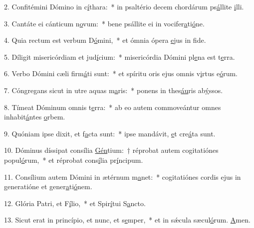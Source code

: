 2. Confitémini Dómino in c\uline{í}thara:~* in psaltério decem chordárum ps\uline{á}llite \uline{i}lli.\par 
3. Cantáte ei cánticum n\uline{o}vum:~* bene psállite ei in vocifer\uline{a}ti\uline{ó}ne.\par 
4. Quia rectum est verbum D\uline{ó}mini,~* et ómnia ópera \uline{e}jus in f\uline{i}de.\par 
5. Díligit misericórdiam et jud\uline{í}cium:~* misericórdia Dómini pl\uline{e}na est t\uline{e}rra.\par 
6. Verbo Dómini cæli firm\uline{á}ti sunt:~* et spíritu oris ejus omnis v\uline{i}rtus e\uline{ó}rum.\par 
7. Cóngregans sicut in utre aquas m\uline{a}ris:~* ponens in thes\uline{áu}ris ab\uline{ý}ssos.\par 
8. Tímeat Dóminum omnis t\uline{e}rra:~* ab eo autem commoveántur omnes inhabit\uline{á}ntes \uline{o}rbem.\par 
9. Quóniam ipse dixit, et f\uline{a}cta sunt:~* ipse mandávit, \uline{e}t cre\uline{á}ta sunt.\par 
10. Dóminus díssipat consília \uline{Gén}tium:~† réprobat autem cogitatiónes popul\uline{ó}rum,~* et réprobat cons\uline{í}lia pr\uline{í}ncipum.\par 
11. Consílium autem Dómini in ætérnum m\uline{a}net:~* cogitatiónes cordis ejus in generatióne et gener\uline{a}ti\uline{ó}nem.\par 
12. Glória Patri, et F\uline{í}lio,~* et Spir\uline{í}tui S\uline{a}ncto.\par 
13. Sicut erat in princípio, et nunc, et s\uline{e}mper,~* et in sǽcula sæcul\uline{ó}rum. \uline{A}men.\par 
